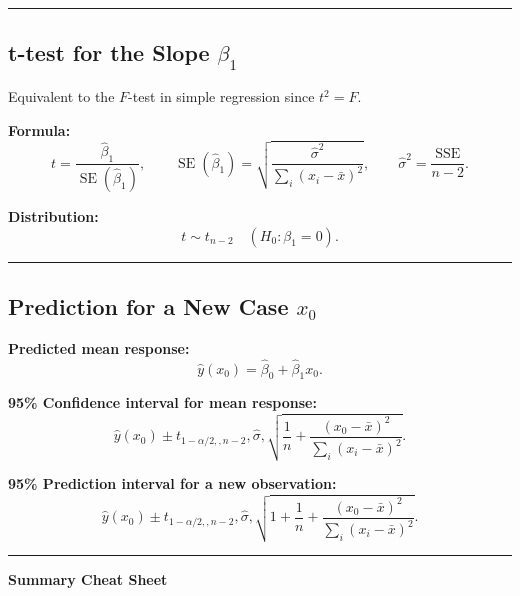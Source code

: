 \documentclass[
  letterpaper,
]{scrbook}
\begin{document}
\begin{center}\rule{0.5\linewidth}{0.5pt}\end{center}

\subsection{\texorpdfstring{t-test for the Slope
\(\beta_1\)}{t-test for the Slope \textbackslash beta\_1}}\label{t-test-for-the-slope-beta_1}

Equivalent to the \(F\)-test in simple regression since \(t^2 = F\).

\textbf{Formula:} \[
t = \frac{\hat\beta_1}{\operatorname{SE}(\hat\beta_1)},
\qquad
\operatorname{SE}(\hat\beta_1) = \sqrt{\frac{\hat\sigma^2}{\sum_i (x_i - \bar x)^2}},
\qquad
\hat\sigma^2 = \frac{\mathrm{SSE}}{n-2}.
\]

\textbf{Distribution:} \[
t \sim t_{n-2}\quad (H_0:\beta_1=0).
\]

\begin{center}\rule{0.5\linewidth}{0.5pt}\end{center}

\subsection{\texorpdfstring{Prediction for a New Case
\(x_0\)}{Prediction for a New Case x\_0}}\label{prediction-for-a-new-case-x_0}

\textbf{Predicted mean response:} \[
\hat y(x_0) = \hat\beta_0 + \hat\beta_1 x_0.
\]

\textbf{95\% Confidence interval for mean response:} \[
\hat y(x_0) \pm t_{1-\alpha/2,,n-2},
\hat\sigma,\sqrt{\frac{1}{n} + \frac{(x_0 - \bar x)^2}{\sum_i (x_i - \bar x)^2}}.
\]

\textbf{95\% Prediction interval for a new observation:} \[
\hat y(x_0) \pm t_{1-\alpha/2,,n-2},
\hat\sigma,\sqrt{1 + \frac{1}{n} + \frac{(x_0 - \bar x)^2}{\sum_i (x_i - \bar x)^2}}.
\]

\begin{center}\rule{0.5\linewidth}{0.5pt}\end{center}

\textbf{Summary Cheat Sheet}
\end{document}
